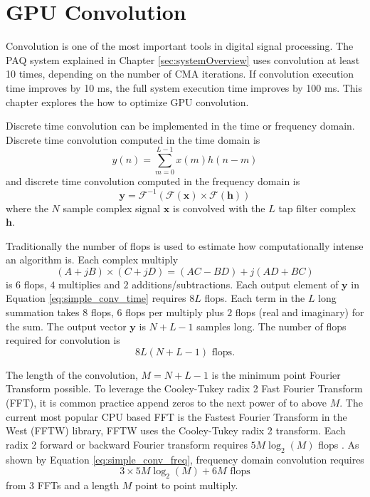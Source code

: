 \chapter{GPU Convolution}
\label{chap:gpu_convolution}
Convolution is one of the most important tools in digital signal processing.
The PAQ system explained in Chapter \ref{sec:systemOverview} uses convolution at least 10 times, depending on the number of CMA iterations.
If convolution execution time improves by 10 ms, the full system execution time improves by 100 ms.
This chapter explores the how to optimize GPU convolution.

Discrete time convolution can be implemented in the time or frequency domain. 
Discrete time convolution computed in the time domain is
\begin{equation}
y(n) = \sum^{L-1}_{m=0} x(m) h(n-m)
  \label{eq:simple_conv_time}
\end{equation}
and discrete time convolution computed in the frequency domain is
\begin{equation}
\mathbf{y} = \mathscr{F}^{-1}(\mathscr{F}(\mathbf{x})\times\mathscr{F}(\mathbf{h}))
  \label{eq:simple_conv_freq}
\end{equation}
where the $N$ sample complex signal $\mathbf{x}$ is convolved with the $L$ tap filter complex $\mathbf{h}$.

Traditionally the number of flops is used to estimate how computationally intense an algorithm is. 
Each complex multiply 
\begin{equation}
(A+jB)\times(C+jD) = (AC-BD)+j(AD+BC)
\end{equation}
is $6$ flops, $4$ multiplies and $2$ additions/subtractions.
Each output element of $\mathbf{y}$ in Equation \eqref{eq:simple_conv_time} requires $8L$ flops.
Each term in the $L$ long summation takes $8$ flops, $6$ flops per multiply plus $2$ flops (real and imaginary)  for the sum.
The output vector $\mathbf{y}$ is $N+L-1$ samples long.
The number of flops required for convolution is
\begin{equation}
8L(N+L-1) \text{ flops}.
\label{eq:flops_time_domain_conv}
\end{equation}

The length of the convolution, $M=N+L-1$ is the minimum point Fourier Transform possible.
To leverage the Cooley-Tukey radix 2 Fast Fourier Transform (FFT), it is common practice append zeros to the next power of to above $M$.
The current most popular CPU based FFT is the Fastest Fourier Transform in the West (FFTW) library, FFTW uses the Cooley-Tukey radix 2 transform.
Each radix 2 forward or backward Fourier transform requires $5M\log_2(M)$ flops \cite{FFTW:2017,cooley1965algorithm}.
As shown by Equation \ref{eq:simple_conv_freq}, frequency domain convolution requires 
\begin{equation}
3\times5M\log_2(M)+6M \text{ flops}
\label{eq:flops_freq_domain_conv}
\end{equation}
from $3$ FFTs and a length $M$ point to point multiply.


